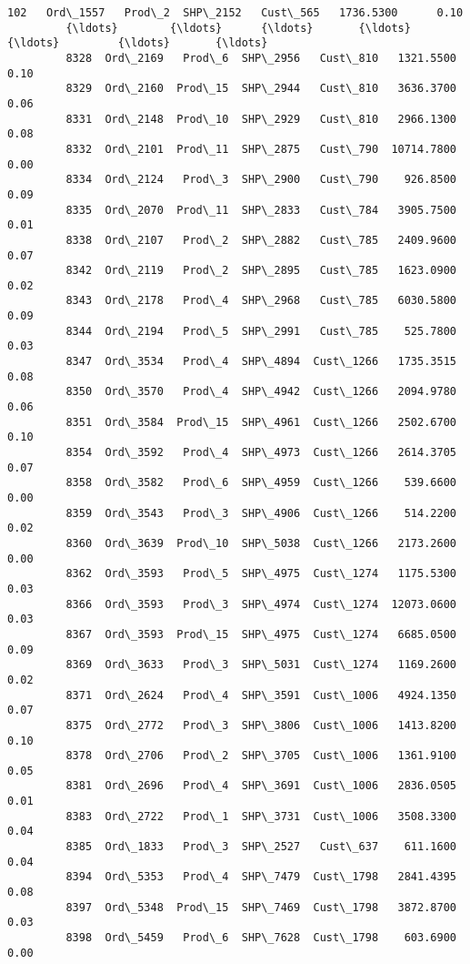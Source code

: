 \documentclass[11pt]{article}
\begin{document}
\begin{Verbatim}[commandchars=\\\{\}]
         102   Ord\_1557   Prod\_2  SHP\_2152   Cust\_565   1736.5300      0.10   
         {\ldots}        {\ldots}      {\ldots}       {\ldots}        {\ldots}         {\ldots}       {\ldots}   
         8328  Ord\_2169   Prod\_6  SHP\_2956   Cust\_810   1321.5500      0.10   
         8329  Ord\_2160  Prod\_15  SHP\_2944   Cust\_810   3636.3700      0.06   
         8331  Ord\_2148  Prod\_10  SHP\_2929   Cust\_810   2966.1300      0.08   
         8332  Ord\_2101  Prod\_11  SHP\_2875   Cust\_790  10714.7800      0.00   
         8334  Ord\_2124   Prod\_3  SHP\_2900   Cust\_790    926.8500      0.09   
         8335  Ord\_2070  Prod\_11  SHP\_2833   Cust\_784   3905.7500      0.01   
         8338  Ord\_2107   Prod\_2  SHP\_2882   Cust\_785   2409.9600      0.07   
         8342  Ord\_2119   Prod\_2  SHP\_2895   Cust\_785   1623.0900      0.02   
         8343  Ord\_2178   Prod\_4  SHP\_2968   Cust\_785   6030.5800      0.09   
         8344  Ord\_2194   Prod\_5  SHP\_2991   Cust\_785    525.7800      0.03   
         8347  Ord\_3534   Prod\_4  SHP\_4894  Cust\_1266   1735.3515      0.08   
         8350  Ord\_3570   Prod\_4  SHP\_4942  Cust\_1266   2094.9780      0.06   
         8351  Ord\_3584  Prod\_15  SHP\_4961  Cust\_1266   2502.6700      0.10   
         8354  Ord\_3592   Prod\_4  SHP\_4973  Cust\_1266   2614.3705      0.07   
         8358  Ord\_3582   Prod\_6  SHP\_4959  Cust\_1266    539.6600      0.00   
         8359  Ord\_3543   Prod\_3  SHP\_4906  Cust\_1266    514.2200      0.02   
         8360  Ord\_3639  Prod\_10  SHP\_5038  Cust\_1266   2173.2600      0.00   
         8362  Ord\_3593   Prod\_5  SHP\_4975  Cust\_1274   1175.5300      0.03   
         8366  Ord\_3593   Prod\_3  SHP\_4974  Cust\_1274  12073.0600      0.03   
         8367  Ord\_3593  Prod\_15  SHP\_4975  Cust\_1274   6685.0500      0.09   
         8369  Ord\_3633   Prod\_3  SHP\_5031  Cust\_1274   1169.2600      0.02   
         8371  Ord\_2624   Prod\_4  SHP\_3591  Cust\_1006   4924.1350      0.07   
         8375  Ord\_2772   Prod\_3  SHP\_3806  Cust\_1006   1413.8200      0.10   
         8378  Ord\_2706   Prod\_2  SHP\_3705  Cust\_1006   1361.9100      0.05   
         8381  Ord\_2696   Prod\_4  SHP\_3691  Cust\_1006   2836.0505      0.01   
         8383  Ord\_2722   Prod\_1  SHP\_3731  Cust\_1006   3508.3300      0.04   
         8385  Ord\_1833   Prod\_3  SHP\_2527   Cust\_637    611.1600      0.04   
         8394  Ord\_5353   Prod\_4  SHP\_7479  Cust\_1798   2841.4395      0.08   
         8397  Ord\_5348  Prod\_15  SHP\_7469  Cust\_1798   3872.8700      0.03   
         8398  Ord\_5459   Prod\_6  SHP\_7628  Cust\_1798    603.6900      0.00   
         

\end{Verbatim}
\end{document}
